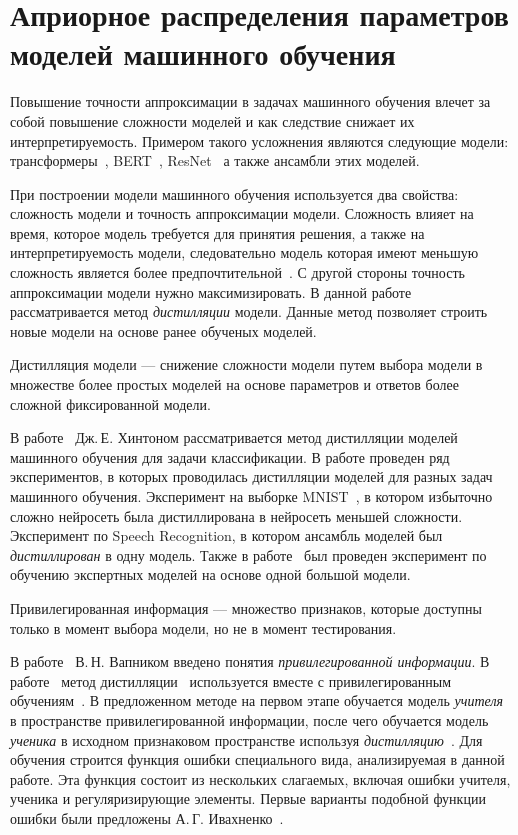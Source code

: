 \chapter{Априорное распределения параметров моделей машинного обучения}

Повышение точности аппроксимации в задачах машинного обучения влечет за собой повышение сложности моделей и как следствие снижает их интерпретируемость. Примером такого усложнения являются следующие модели: трансформеры~\cite{Vaswani2017}, BERT~\cite{Devlin2018}, ResNet~\cite{Kaiming2015} а также ансамбли этих моделей. 

При построении модели машинного обучения используется два свойства: сложность модели и точность аппроксимации модели. Сложность влияет на время, которое модель требуется для принятия решения, а также на интерпретируемость модели, следовательно модель которая имеют меньшую сложность является более предпочтительной~\cite{bachteev2018}. С другой стороны точность аппроксимации модели нужно максимизировать. В данной работе рассматривается метод \textit{дистилляции} модели. Данные метод позволяет строить новые модели на основе ранее обученых моделей.

\begin{definition}
Дистилляция модели --- снижение сложности модели путем выбора модели в множестве более простых моделей на основе параметров и ответов более сложной фиксированной модели.
\end{definition}

В работе~\cite{Hinton2015} Дж.\,Е. Хинтоном рассматривается метод дистилляции моделей машинного обучения для задачи классификации. В работе проведен ряд экспериментов, в которых проводилась дистилляции моделей для разных задач машинного обучения. Эксперимент на выборке MNIST~\cite{mnist}, в котором избыточно сложно нейросеть была дистиллирована в нейросеть меньшей сложности. Эксперимент по Speech Recognition, в котором ансамбль моделей был \textit{дистиллирован} в одну модель. Также в работе~\cite{Hinton2015} был проведен эксперимент по обучению экспертных моделей на основе одной большой модели.

\begin{definition}
Привилегированная информация --- множество признаков, которые доступны только в момент выбора модели, но не в момент тестирования.
\end{definition}

В работе~\cite{Vapnik2015} В.\,Н. Вапником введено понятия \textit{привилегированной информации}. В работе~\cite{Lopez2016} метод дистилляции~\cite{Hinton2015} используется вместе с привилегированным обучениям~\cite{Vapnik2015}. В предложенном методе на первом этапе обучается модель \textit{учителя} в пространстве привилегированной информации, после чего обучается модель \textit{ученика} в исходном признаковом пространстве используя \textit{дистилляцию}~\cite{Hinton2015}. Для обучения строится функция ошибки специального вида, анализируемая в данной работе. Эта функция состоит из нескольких слагаемых, включая ошибки учителя, ученика и регуляризирующие элементы.  Первые варианты подобной функции ошибки были предложены А.\,Г. Ивахненко~\cite{Ivakhnenko1994}.

